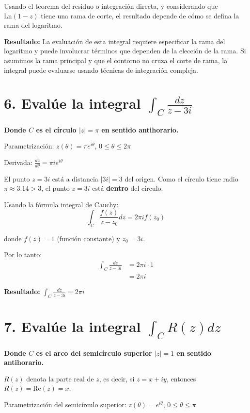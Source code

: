 \documentclass{article}
\begin{document}
Usando el teorema del residuo o integración directa, y considerando que $\text{Ln}(1-z)$ tiene una rama de corte, el resultado depende de cómo se defina la rama del logaritmo.

\textbf{Resultado:} La evaluación de esta integral requiere especificar la rama del logaritmo y puede involucrar términos que dependen de la elección de la rama. Si asumimos la rama principal y que el contorno no cruza el corte de rama, la integral puede evaluarse usando técnicas de integración compleja.

\section*{6. Evalúe la integral $\int_C \frac{dz}{z - 3i}$}

\textbf{Donde $C$ es el círculo $|z| = \pi$ en sentido antihorario.}

Parametrización: $z(\theta) = \pi e^{i\theta}$, $0 \leq \theta \leq 2\pi$

Derivada: $\frac{dz}{d\theta} = \pi i e^{i\theta}$

El punto $z = 3i$ está a distancia $|3i| = 3$ del origen. Como el círculo tiene radio $\pi \approx 3.14 > 3$, el punto $z = 3i$ está \textbf{dentro} del círculo.

Usando la fórmula integral de Cauchy:
$$\int_C \frac{f(z)}{z - z_0} dz = 2\pi i f(z_0)$$

donde $f(z) = 1$ (función constante) y $z_0 = 3i$.

Por lo tanto:
\begin{align*}
\int_C \frac{dz}{z - 3i} &= 2\pi i \cdot 1 \\
                          &= 2\pi i
\end{align*}

\textbf{Resultado:} $\int_C \frac{dz}{z - 3i} = 2\pi i$

\section*{7. Evalúe la integral $\int_C R(z) dz$}

\textbf{Donde $C$ es el arco del semicírculo superior $|z| = 1$ en sentido antihorario.}

$R(z)$ denota la parte real de $z$, es decir, si $z = x + iy$, entonces $R(z) = \text{Re}(z) = x$.

Parametrización del semicírculo superior: $z(\theta) = e^{i\theta}$, $0 \leq \theta \leq \pi$
\end{document}
